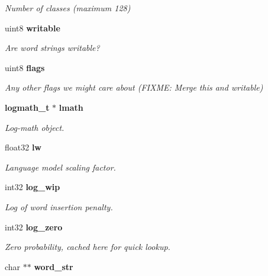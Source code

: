 \begin{DoxyCompactItemize}
\begin{DoxyCompactList}\small\item\em Number of classes (maximum 128) \end{DoxyCompactList}\item 
uint8 {\bf writable}\label{structngram__model__s_a78a3253febced2cae4732044da466ee6}

\begin{DoxyCompactList}\small\item\em Are word strings writable? \end{DoxyCompactList}\item 
uint8 {\bf flags}\label{structngram__model__s_ac609a2f867496d6ca719351d566db328}

\begin{DoxyCompactList}\small\item\em Any other flags we might care about (F\+I\+X\+M\+E\+: Merge this and writable) \end{DoxyCompactList}\item 
{\bf logmath\+\_\+t} $\ast$ {\bf lmath}\label{structngram__model__s_a2ca373109c651ac998b33153eb38fd95}

\begin{DoxyCompactList}\small\item\em Log-\/math object. \end{DoxyCompactList}\item 
float32 {\bf lw}\label{structngram__model__s_a76ea0c65b23de80091e7c602bdb43bde}

\begin{DoxyCompactList}\small\item\em Language model scaling factor. \end{DoxyCompactList}\item 
int32 {\bf log\+\_\+wip}\label{structngram__model__s_a3d6bf5632760a16e52cb881d7010d774}

\begin{DoxyCompactList}\small\item\em Log of word insertion penalty. \end{DoxyCompactList}\item 
int32 {\bf log\+\_\+zero}\label{structngram__model__s_a65425a599c4bcc4dda809d81149b8fc0}

\begin{DoxyCompactList}\small\item\em Zero probability, cached here for quick lookup. \end{DoxyCompactList}\item 
char $\ast$$\ast$ {\bf word\+\_\+str}\label{structngram__model__s_ae625e779e340845f03fb3da164e93039}


\end{DoxyCompactItemize}
